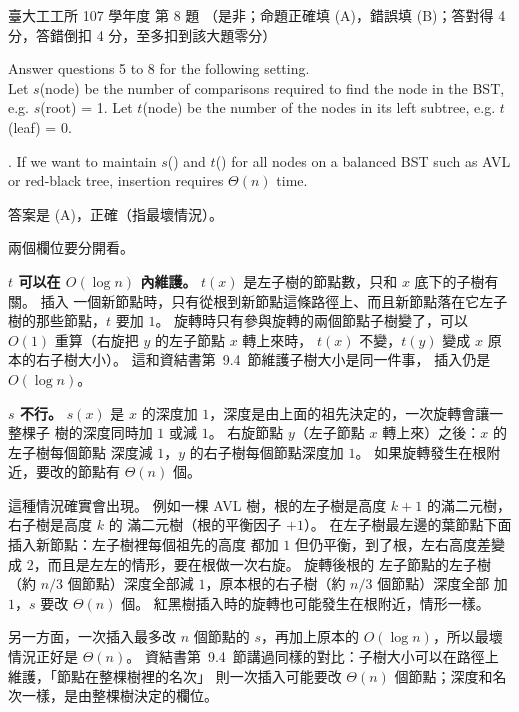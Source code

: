 \begin{pastexam}[label={px:ntu-107-ie-ds-08}]{臺大工工所 107 學年度 第 8 題}
（是非；命題正確填 (A)，錯誤填 (B)；答對得 4 分，答錯倒扣 4 分，至多扣到該大題零分）

Answer questions 5 to 8 for the following setting.\\
Let $s$(node) be the number of comparisons required to find the node in the BST, e.g. $s$(root) = 1. Let $t$(node) be the number of the nodes in its left subtree, e.g. $t$(leaf) = 0.

. If we want to maintain $s$() and $t$() for all nodes on a balanced BST such as AVL or red-black tree, insertion requires $\Theta(n)$ time.
\end{pastexam}

\begin{pastsoln}
答案是 (A)，正確（指最壞情況）。

兩個欄位要分開看。

\textbf{$t$ 可以在 $O(\log n)$ 內維護。} $t(x)$ 是左子樹的節點數，只和 $x$ 底下的子樹有關。 插入
一個新節點時，只有從根到新節點這條路徑上、而且新節點落在它左子樹的那些節點，$t$ 要加 $1$。
旋轉時只有參與旋轉的兩個節點子樹變了，可以 $O(1)$ 重算（右旋把 $y$ 的左子節點 $x$ 轉上來時，
$t(x)$ 不變，$t(y)$ 變成 $x$ 原本的右子樹大小）。 這和資結書第~9.4~節維護子樹大小是同一件事，
插入仍是 $O(\log n)$。

\textbf{$s$ 不行。} $s(x)$ 是 $x$ 的深度加 $1$，深度是由上面的祖先決定的，一次旋轉會讓一整棵子
樹的深度同時加 $1$ 或減 $1$。 右旋節點 $y$（左子節點 $x$ 轉上來）之後：$x$ 的左子樹每個節點
深度減 $1$，$y$ 的右子樹每個節點深度加 $1$。 如果旋轉發生在根附近，要改的節點有 $\Theta(n)$
個。

這種情況確實會出現。 例如一棵 AVL 樹，根的左子樹是高度 $k + 1$ 的滿二元樹，右子樹是高度 $k$ 的
滿二元樹（根的平衡因子 $+1$）。 在左子樹最左邊的葉節點下面插入新節點：左子樹裡每個祖先的高度
都加 $1$ 但仍平衡，到了根，左右高度差變成 $2$，而且是左左的情形，要在根做一次右旋。 旋轉後根的
左子節點的左子樹（約 $n/3$ 個節點）深度全部減 $1$，原本根的右子樹（約 $n/3$ 個節點）深度全部
加 $1$，$s$ 要改 $\Theta(n)$ 個。 紅黑樹插入時的旋轉也可能發生在根附近，情形一樣。

另一方面，一次插入最多改 $n$ 個節點的 $s$，再加上原本的 $O(\log n)$，所以最壞情況正好是
$\Theta(n)$。 資結書第~9.4~節講過同樣的對比：子樹大小可以在路徑上維護，「節點在整棵樹裡的名次」
則一次插入可能要改 $\Theta(n)$ 個節點；深度和名次一樣，是由整棵樹決定的欄位。
\end{pastsoln}
